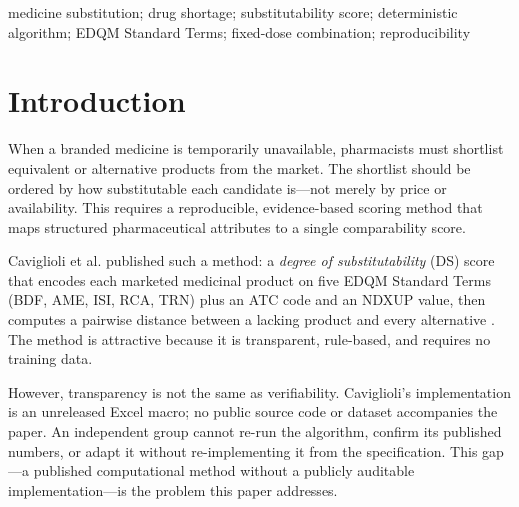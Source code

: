 \documentclass[twocolumn,a4paper]{elsarticle}
\begin{document}
\begin{frontmatter}
\begin{abstract}
\textbf{Conclusions.} The implementation independently reproduces the available labelled examples of the published specification under a documented interpretation, with honest documentation of where the published tables are internally inconsistent. The fixed-dose-combination extension is explicitly labelled as our own preliminary adaptation and is unvalidated against published ground truth. No clinical interchangeability or therapeutic-equivalence claim is made. The implementation, test suite, and generated outputs are maintained in the authors' project directory; a public repository has not yet been released.
\end{abstract}

\begin{keyword}
medicine substitution; drug shortage; substitutability score; deterministic algorithm; EDQM Standard Terms; fixed-dose combination; reproducibility
\end{keyword}

\end{frontmatter}

\section{Introduction}
\label{sec:intro}

When a branded medicine is temporarily unavailable, pharmacists must shortlist equivalent or alternative products from the market. The shortlist should be ordered by how substitutable each candidate is---not merely by price or availability. This requires a reproducible, evidence-based scoring method that maps structured pharmaceutical attributes to a single comparability score.

Caviglioli et al.\citep{caviglioli2025medicine} published such a method: a \emph{degree of substitutability} (DS) score that encodes each marketed medicinal product on five EDQM Standard Terms (BDF, AME, ISI, RCA, TRN) plus an ATC code and an NDXUP value, then computes a pairwise distance between a lacking product and every alternative \citep{caviglioli2025medicine}. The method is attractive because it is transparent, rule-based, and requires no training data.

However, transparency is not the same as verifiability. Caviglioli's implementation is an unreleased Excel macro; no public source code or dataset accompanies the paper. An independent group cannot re-run the algorithm, confirm its published numbers, or adapt it without re-implementing it from the specification. This gap---a published computational method without a publicly auditable implementation---is the problem this paper addresses.
\end{document}
